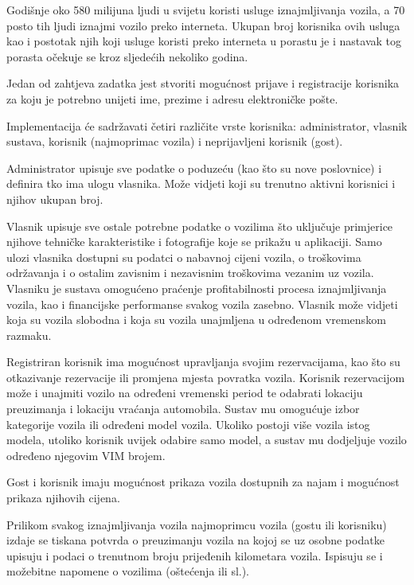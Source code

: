 		 
		 \text Godišnje oko 580 milijuna ljudi u svijetu koristi usluge iznajmljivanja vozila, a 70 posto tih ljudi iznajmi vozilo preko interneta. Ukupan broj korisnika ovih usluga kao i postotak njih koji usluge koristi preko interneta u porastu je i nastavak tog porasta očekuje se kroz sljedećih nekoliko godina. \par
		 \text Jedan od zahtjeva zadatka jest stvoriti mogućnost prijave i registracije korisnika za koju je potrebno unijeti ime, prezime i adresu elektroničke pošte. \par 
         \text Implementacija će sadržavati četiri različite vrste korisnika: administrator, vlasnik sustava,
korisnik (najmoprimac vozila) i neprijavljeni korisnik (gost). \par
        \text Administrator upisuje sve podatke o poduzeću (kao što su nove poslovnice) i definira tko ima ulogu vlasnika. Može vidjeti koji su trenutno aktivni korisnici i njihov ukupan broj.\par 
\text Vlasnik upisuje sve ostale potrebne podatke o vozilima što uključuje primjerice njihove tehničke
karakteristike i fotografije koje se prikažu u aplikaciji.  Samo ulozi vlasnika 
dostupni su podatci o nabavnoj cijeni vozila, o troškovima održavanja i o ostalim zavisnim
i nezavisnim troškovima vezanim uz vozila.
Vlasniku je sustava omogućeno praćenje profitabilnosti procesa
iznajmljivanja vozila, kao i financijske performanse svakog vozila zasebno. Vlasnik može vidjeti koja su vozila slobodna i koja su vozila unajmljena u određenom vremenskom razmaku. \par 
\text Registriran korisnik ima mogućnost upravljanja svojim rezervacijama, kao što su otkazivanje rezervacije ili promjena mjesta povratka vozila. Korisnik rezervacijom može i unajmiti vozilo na određeni vremenski period te odabrati lokaciju preuzimanja i lokaciju vraćanja automobila. Sustav
mu omogućuje izbor kategorije vozila ili određeni model vozila. Ukoliko postoji
više vozila istog modela, utoliko korisnik uvijek odabire samo model, a sustav mu dodjeljuje
vozilo određeno njegovim VIM brojem. \par 
\text Gost i korisnik imaju mogućnost prikaza vozila dostupnih za najam i mogućnost prikaza njihovih cijena. \par 
 \text Prilikom svakog iznajmljivanja vozila najmoprimcu vozila (gostu ili korisniku) izdaje se tiskana potvrda o
preuzimanju vozila na kojoj se uz osobne podatke upisuju i podaci o trenutnom broju
prijeđenih kilometara vozila. Ispisuju se i možebitne napomene o vozilima (oštećenja ili sl.).\par 
